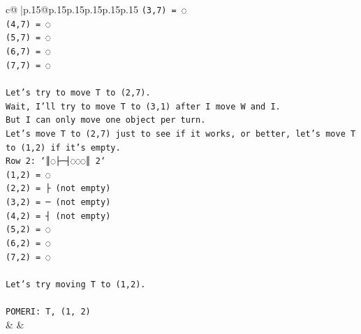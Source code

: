 \documentclass{article}
\begin{document}
{\begin{supertabular}{c@{$\;$}|p{.15\linewidth}@{}p{.15\linewidth}p{.15\linewidth}p{.15\linewidth}p{.15\linewidth}p{.15\linewidth}}
{{{\texttt{(3,7) = ◌} \\
\texttt{(4,7) = ◌} \\
\texttt{(5,7) = ◌} \\
\texttt{(6,7) = ◌} \\
\texttt{(7,7) = ◌} \\
\\ 
\texttt{Let's try to move T to (2,7).} \\
\texttt{Wait, I'll try to move T to (3,1) after I move W and I.} \\
\texttt{But I can only move one object per turn.} \\
\texttt{Let's move T to (2,7) just to see if it works, or better, let's move T to (1,2) if it's empty.} \\
\texttt{Row 2: `║◌├─┤◌◌◌║ 2`} \\
\texttt{(1,2) = ◌} \\
\texttt{(2,2) = ├ (not empty)} \\
\texttt{(3,2) = ─ (not empty)} \\
\texttt{(4,2) = ┤ (not empty)} \\
\texttt{(5,2) = ◌} \\
\texttt{(6,2) = ◌} \\
\texttt{(7,2) = ◌} \\
\\ 
\texttt{Let's try moving T to (1,2).} \\
\\ 
\texttt{POMERI: T, (1, 2)} \\
            }
        }
    }
    & & \\ \\


\end{supertabular}}
\end{document}
